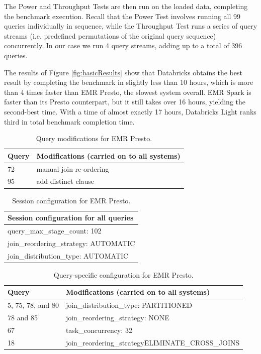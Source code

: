 The Power and Throughput Tests are then run on the loaded data, completing the benchmark execution. Recall that the Power Test involves running all 99 queries individually in sequence, while the Throughput Test runs a series of query streams (i.e. predefined permutations of the original query sequence) concurrently. In our case we run 4 query streams, adding up to a total of 396 queries.

The results of Figure \ref{fig:basicResults} show that Databricks obtains the best result by completing the benchmark in slightly less than 10 hours, which is more than 4 times faster than EMR Presto, the slowest system overall. EMR Spark is faster than its Presto counterpart, but it still takes over 16 hours, yielding the second-best time. With a time of almost exactly 17 hours, Databricks Light ranks third in total benchmark completion time.

\begin{table}
  \centering
	\begin{tabular}{|l|l|}
	  \hline
		\textbf{Query} & \textbf{Modifications (carried on to all systems)} \\ \hline
		72 & manual join re-ordering  \\ \hline
		95 & add distinct clause \\ \hline
	\end{tabular}
	\caption{Query modifications for EMR Presto.}
	\label{table:prestoModifiedQueries}
\end{table}

\begin{table}
  \centering
	\begin{tabular}{|l|}
	  \hline
		\textbf{Session configuration for all queries} \\ \hline
		query\_max\_stage\_count: 102  \\ \hline
		join\_reordering\_strategy: AUTOMATIC \\ \hline
		join\_distribution\_type: AUTOMATIC \\ \hline
	\end{tabular}
	\caption{Session configuration for EMR Presto.}
	\label{table:prestoSessionConf}
\end{table}

\begin{table}
  \centering
	\begin{tabular}{|l|l|}
	  \hline
		\textbf{Query} & \textbf{Modifications (carried on to all systems)} \\ \hline
		5, 75, 78, and 80 & join\_distribution\_type: PARTITIONED \\ \hline
		78 and 85 & join\_reordering\_strategy: NONE \\ \hline
		67 & task\_concurrency: 32 \\ \hline
		18 & join\_reordering\_strategy\=ELIMINATE\_CROSS\_JOINS \\ \hline
	\end{tabular}
	\caption{Query-specific configuration for EMR Presto.}
	\label{table:prestoQuerySpecificConf}
\end{table}

